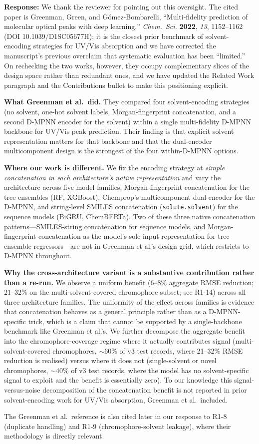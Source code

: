 \documentclass[11pt]{article}
\newcommand{\response}[1]{\noindent\textbf{Response:} #1\par\medskip}
\begin{document}
\response{We thank the reviewer for pointing out this oversight. The cited paper is Greenman, Green, and G\'omez-Bombarelli, ``Multi-fidelity prediction of molecular optical peaks with deep learning,'' \textit{Chem.\ Sci.} \textbf{2022}, \textit{13}, 1152--1162 (DOI 10.1039/D1SC05677H); it is the closest prior benchmark of solvent-encoding strategies for UV/Vis absorption and we have corrected the manuscript's previous overclaim that systematic evaluation has been ``limited.'' On rechecking the two works, however, they occupy complementary slices of the design space rather than redundant ones, and we have updated the Related Work paragraph and the Contributions bullet to make this positioning explicit.

\textbf{What Greenman et al.\ did.} They compared four solvent-encoding strategies (no solvent, one-hot solvent labels, Morgan-fingerprint concatenation, and a second D-MPNN encoder for the solvent) within a single multi-fidelity D-MPNN backbone for UV/Vis peak prediction. Their finding is that explicit solvent representation matters for that backbone and that the dual-encoder multicomponent design is the strongest of the four within-D-MPNN options.

\textbf{Where our work is different.} We fix the encoding strategy at \emph{simple concatenation in each architecture's native representation} and vary the architecture across five model families: Morgan-fingerprint concatenation for the tree ensembles (RF, XGBoost), Chemprop's multicomponent dual-encoder for the D-MPNN, and string-level SMILES concatenation (\texttt{solute.solvent}) for the sequence models (BiGRU, ChemBERTa). Two of these three native concatenation patterns---SMILES-string concatenation for sequence models, and Morgan-fingerprint concatenation as the model's sole input representation for tree-ensemble regressors---are not in Greenman et al.'s design grid, which restricts to D-MPNN throughout.

\textbf{Why the cross-architecture variant is a substantive contribution rather than a re-run.} We observe a uniform benefit ($6$--$8$\% aggregate RMSE reduction; $21$--$32$\% on the multi-solvent-covered chromophore subset; see R1-14) across all three architecture families. The uniformity of the effect across families is evidence that concatenation behaves as a general principle rather than as a D-MPNN-specific trick, which is a claim that cannot be supported by a single-backbone benchmark like Greenman et al.'s. We further decompose the aggregate benefit into the chromophore-coverage regime where it actually contributes signal (multi-solvent-covered chromophores, $\sim$60\% of v3 test records, where 21--32\% RMSE reduction is realised) versus where it does not (single-solvent or novel chromophores, $\sim$40\% of v3 test records, where the model has no solvent-specific signal to exploit and the benefit is essentially zero). To our knowledge this signal-versus-noise decomposition of the concatenation benefit is not reported in prior solvent-encoding work for UV/Vis absorption, Greenman et al.\ included.

The Greenman et al.\ reference is also cited later in our response to R1-8 (duplicate handling) and R1-9 (chromophore-solvent leakage), where their methodology is directly relevant.}
\end{document}
